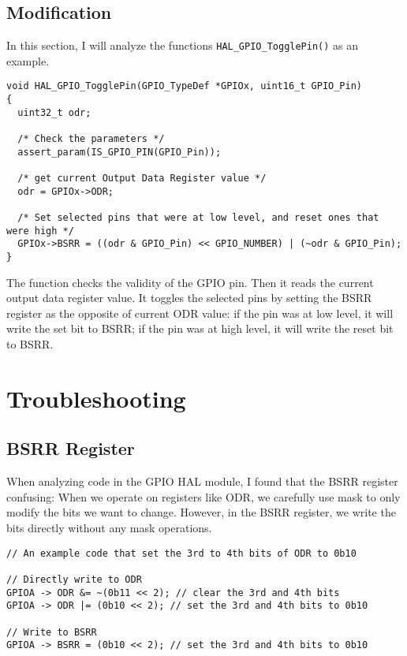 \documentclass[a4paper,12pt]{article}
\begin{document}
\subsection{Modification}

In this section, I will analyze the functions \texttt{HAL\_GPIO\_TogglePin()} as an example.

\begin{verbatim}
void HAL_GPIO_TogglePin(GPIO_TypeDef *GPIOx, uint16_t GPIO_Pin)
{
  uint32_t odr;

  /* Check the parameters */
  assert_param(IS_GPIO_PIN(GPIO_Pin));

  /* get current Output Data Register value */
  odr = GPIOx->ODR;

  /* Set selected pins that were at low level, and reset ones that were high */
  GPIOx->BSRR = ((odr & GPIO_Pin) << GPIO_NUMBER) | (~odr & GPIO_Pin);
}  
\end{verbatim}

The function checks the validity of the GPIO pin. Then it reads the current output data register value. It toggles the selected pins by setting the BSRR register as the opposite of current ODR value: if the pin was at low level, it will write the set bit to BSRR; if the pin was at high level, it will write the reset bit to BSRR.

\section{Troubleshooting}

\subsection{BSRR Register}

When analyzing code in the GPIO HAL module, I found that the BSRR register confusing: When we operate on registers like ODR, we carefully use mask to only modify the bits we want to change. However, in the BSRR register, we write the bits directly without any mask operations.

\begin{verbatim}
// An example code that set the 3rd to 4th bits of ODR to 0b10

// Directly write to ODR
GPIOA -> ODR &= ~(0b11 << 2); // clear the 3rd and 4th bits
GPIOA -> ODR |= (0b10 << 2); // set the 3rd and 4th bits to 0b10

// Write to BSRR
GPIOA -> BSRR = (0b10 << 2); // set the 3rd and 4th bits to 0b10
\end{verbatim}
\end{document}
